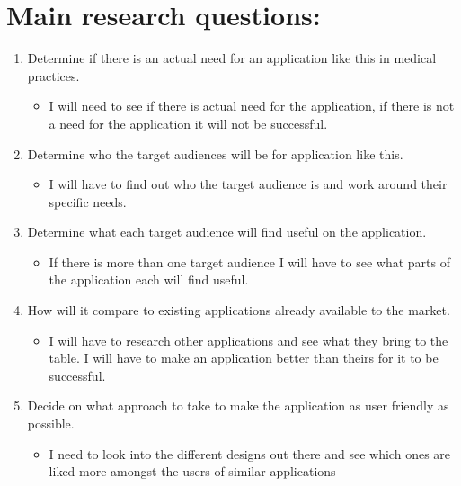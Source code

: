 \documentclass[12pt,ITBthesis]{report}
\begin{document}
	\section{Main research questions:}
	\begin{enumerate}
		\item Determine if there is an actual need for an application like this in medical practices.
			\begin{itemize}
				\item I will need to see if there is actual need for the application, if there is not a need for the application it will not be successful.
			\end{itemize}
		\item Determine who the target audiences will be for application like this.
			\begin{itemize}
				\item I will have to find out who the target audience is and work around their specific needs. 
			\end{itemize}
		\item Determine what each target audience will find useful on the application.
			\begin{itemize}
				\item If there is more than one target audience I will have to see what parts of the application each will find useful.
			\end{itemize}
		\item How will it compare to existing applications already available to the market.
			\begin{itemize}
				\item I will have to research other applications and see what they bring to the table. I will have to make an application better than theirs for it to be successful.
			\end{itemize}
		\item Decide on what approach to take to make the application as user friendly as possible.
			\begin{itemize}
				\item I need to look into the different designs out there and see which ones are liked more amongst the users of similar applications
			\end{itemize}
	\end{enumerate}
	
\end{document}

